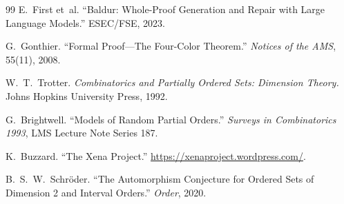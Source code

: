 \documentclass[11pt]{article}
\theoremstyle{definition}
\begin{document}
\begin{thebibliography}{99}
E.~First et~al.
``Baldur: Whole-Proof Generation and Repair with Large Language Models.''
ESEC/FSE, 2023.

G.~Gonthier.
``Formal Proof---The Four-Color Theorem.''
\emph{Notices of the AMS}, 55(11), 2008.

W.~T.~Trotter.
\emph{Combinatorics and Partially Ordered Sets: Dimension Theory.}
Johns Hopkins University Press, 1992.

G.~Brightwell.
``Models of Random Partial Orders.''
\emph{Surveys in Combinatorics 1993}, LMS Lecture Note Series 187.

K.~Buzzard.
``The Xena Project.''
\url{https://xenaproject.wordpress.com/}.

B.~S.~W.~Schr\"oder.
``The Automorphism Conjecture for Ordered Sets of Dimension 2 and Interval Orders.''
\emph{Order}, 2020.

\end{thebibliography}
\end{document}
